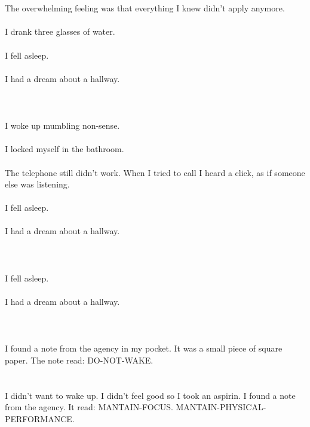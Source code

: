 \documentclass{article}
\begin{document}
    \section{}
    The overwhelming feeling was that everything I knew didn't apply anymore.\\\\I drank three glasses of water.\\\\I fell asleep.\\\\I had a dream about a hallway.\\\\ 
    \newpage
    
    \section{}
    I woke up mumbling non-sense.\\\\I locked myself in the bathroom.\\\\The telephone still didn't work. When I tried to call I heard a click, as if someone else was listening.\\\\I fell asleep.\\\\I had a dream about a hallway.\\\\ 
    \newpage
    
    \section{}
    I fell asleep.\\\\I had a dream about a hallway.\\\\ 
    \newpage
    
    \section{}
    I found a note from the agency in my pocket. It was a small piece of square paper. The note read: DO-NOT-WAKE.  
    \newpage
    
    \section{}
    I didn't want to wake up. I didn't feel good so I took an aspirin. I found a note from the agency. It read: MANTAIN-FOCUS. MANTAIN-PHYSICAL-PERFORMANCE.  
    \newpage
    
\end{document}
